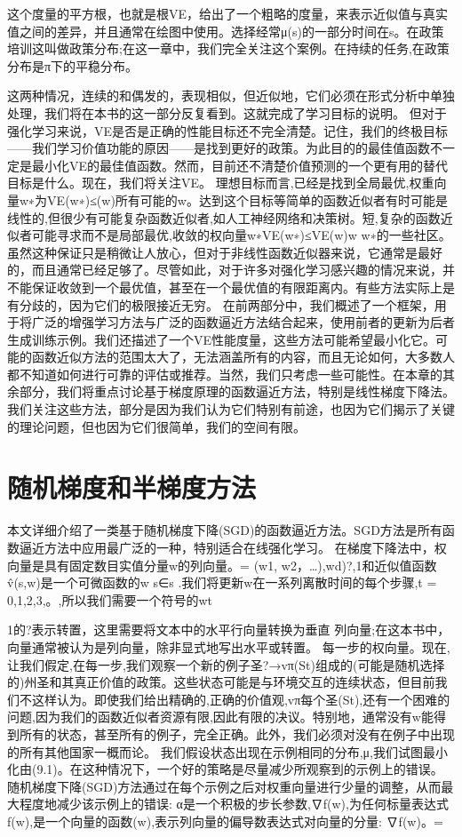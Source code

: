 这个度量的平方根，也就是根VE，给出了一个粗略的度量，来表示近似值与真实值之间的差异，并且通常在绘图中使用。选择经常μ(s)的一部分时间在s。在政策培训这叫做政策分布;在这一章中，我们完全关注这个案例。在持续的任务,在政策分布是π下的平稳分布。

这两种情况，连续的和偶发的，表现相似，但近似地，它们必须在形式分析中单独处理，我们将在本书的这一部分反复看到。这就完成了学习目标的说明。
但对于强化学习来说，VE是否是正确的性能目标还不完全清楚。记住，我们的终极目标——我们学习价值功能的原因——是找到更好的政策。为此目的的最佳值函数不一定是最小化VE的最佳值函数。然而，目前还不清楚价值预测的一个更有用的替代目标是什么。现在，我们将关注VE。
理想目标而言,已经是找到全局最优,权重向量w∗为VE(w∗)≤(w)所有可能的w。达到这个目标等简单的函数近似者有时可能是线性的,但很少有可能复杂函数近似者,如人工神经网络和决策树。短,复杂的函数近似者可能寻求而不是局部最优,收敛的权向量w∗VE(w∗)≤VE(w)w w∗的一些社区。虽然这种保证只是稍微让人放心，但对于非线性函数近似器来说，它通常是最好的，而且通常已经足够了。尽管如此，对于许多对强化学习感兴趣的情况来说，并不能保证收敛到一个最优值，甚至在一个最优值的有限距离内。有些方法实际上是有分歧的，因为它们的极限接近无穷。
在前两部分中，我们概述了一个框架，用于将广泛的增强学习方法与广泛的函数逼近方法结合起来，使用前者的更新为后者生成训练示例。我们还描述了一个VE性能度量，这些方法可能希望最小化它。可能的函数近似方法的范围太大了，无法涵盖所有的内容，而且无论如何，大多数人都不知道如何进行可靠的评估或推荐。当然，我们只考虑一些可能性。在本章的其余部分，我们将重点讨论基于梯度原理的函数逼近方法，特别是线性梯度下降法。我们关注这些方法，部分是因为我们认为它们特别有前途，也因为它们揭示了关键的理论问题，但也因为它们很简单，我们的空间有限。


\section{随机梯度和半梯度方法}

本文详细介绍了一类基于随机梯度下降(SGD)的函数逼近方法。SGD方法是所有函数逼近方法中应用最广泛的一种，特别适合在线强化学习。
在梯度下降法中，权向量是具有固定数目实值分量w的列向量。= (w1, w2，…),wd)?,1和近似值函数v̂(s,w)是一个可微函数的w s∈s .我们将更新w在一系列离散时间的每个步骤,t = 0,1,2,3,。,所以我们需要一个符号的wt

1的?表示转置，这里需要将文本中的水平行向量转换为垂直
列向量;在这本书中，向量通常被认为是列向量，除非显式地写出水平或转置。
每一步的权向量。现在,让我们假定,在每一步,我们观察一个新的例子圣?→vπ(St)组成的(可能是随机选择的)州圣和其真正价值的政策。这些状态可能是与环境交互的连续状态，但目前我们不这样认为。即使我们给出精确的,正确的价值观,vπ每个圣(St),还有一个困难的问题,因为我们的函数近似者资源有限,因此有限的决议。特别地，通常没有w能得到所有的状态，甚至所有的例子，完全正确。此外，我们必须对没有在例子中出现的所有其他国家一概而论。
我们假设状态出现在示例相同的分布,μ,我们试图最小化由(9.1)。在这种情况下，一个好的策略是尽量减少所观察到的示例上的错误。随机梯度下降(SGD)方法通过在每个示例之后对权重向量进行少量的调整，从而最大程度地减少该示例上的错误:
α是一个积极的步长参数,∇f(w),为任何标量表达式f(w),是一个向量的函数(w),表示列向量的偏导数表达式对向量的分量:
∇f(w)。=

